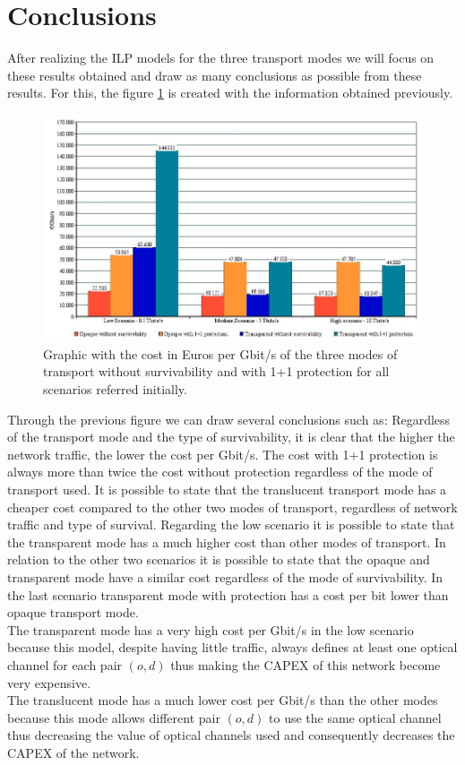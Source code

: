 \clearpage

\section{Conclusions}

After realizing the ILP models for the three transport modes we will focus on these results obtained and draw as many conclusions as possible from these results. For this, the figure \ref{graphic_comparative} is created with the information obtained previously.

\begin{figure}[h!]
\centering
\includegraphics[width=\textwidth]{sdf/ilp/figures/comparative_image}
\caption{Graphic with the cost in Euros per Gbit/s of the three modes of transport without survivability and with 1+1 protection for all scenarios referred initially.}
\label{graphic_comparative}
\end{figure}

Through the previous figure we can draw several conclusions such as:
Regardless of the transport mode and the type of survivability, it is clear that the higher the network traffic, the lower the cost per Gbit/s.
The cost with 1+1 protection is always more than twice the cost without protection regardless of the mode of transport used.
It is possible to state that the translucent transport mode has a cheaper cost compared to the other two modes of transport, regardless of network traffic and type of survival.
Regarding the low scenario it is possible to state that the transparent mode has a much higher cost than other modes of transport.
In relation to the other two scenarios it is possible to state that the opaque and transparent mode have a similar cost regardless of the mode of survivability. In the last scenario transparent mode with protection has a cost per bit lower than opaque transport mode.\\

The transparent mode has a very high cost per Gbit/s in the low scenario because this model, despite having little traffic, always defines at least one optical channel for each pair $(o,d)$ thus making the CAPEX of this network become very expensive.\\

The translucent mode has a much lower cost per Gbit/s than the other modes because this mode allows different pair $(o,d)$ to use the same optical channel thus decreasing the value of optical channels used and consequently decreases the CAPEX of the network.\\
